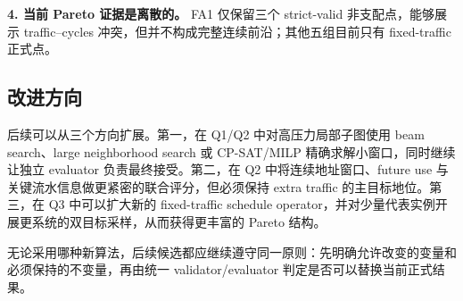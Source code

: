 \textbf{4. 当前 Pareto 证据是离散的。}
FA1 仅保留三个 strict-valid 非支配点，能够展示 traffic--cycles 冲突，但并不构成完整连续前沿；其他五组目前只有 fixed-traffic 正式点。

\subsection{改进方向}

后续可以从三个方向扩展。第一，在 Q1/Q2 中对高压力局部子图使用 beam search、large neighborhood search 或 CP-SAT/MILP 精确求解小窗口，同时继续让独立 evaluator 负责最终接受。第二，在 Q2 中将连续地址窗口、future use 与关键流水信息做更紧密的联合评分，但必须保持 extra traffic 的主目标地位。第三，在 Q3 中可以扩大新的 fixed-traffic schedule operator，并对少量代表实例开展更系统的双目标采样，从而获得更丰富的 Pareto 结构。

无论采用哪种新算法，后续候选都应继续遵守同一原则：先明确允许改变的变量和必须保持的不变量，再由统一 validator/evaluator 判定是否可以替换当前正式结果。